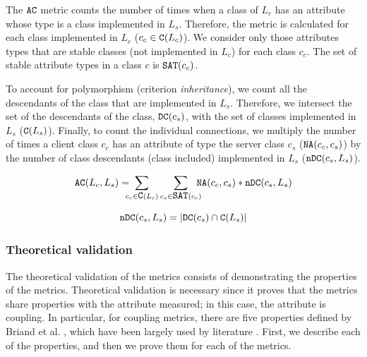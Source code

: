 The $\verb|AC|$ metric counts the number of times when a class of $L_c$ has an attribute whose type is a class implemented in $L_s$. Therefore, the metric is calculated for each class implemented in $L_c$ ($c_c \in \verb|C|(L_c)$). We consider only those attributes types that are stable classes (not implemented in $L_c$) for each class $c_c$. The set of stable attribute types in a class $c$ is $\verb|SAT|(c_c)$.

To account for polymorphism (criterion \textit{inheritance}), we count all the descendants of the class that are implemented in $L_s$. Therefore, we intersect the set of the descendants of the class, $\verb|DC|(c_s)$, with the set of
classes implemented in $L_s$ ($\verb|C|(L_s)$). Finally, to count the  individual connections, we multiply the number of times a client class $c_c$ has an attribute of type the server class $c_s$ ($\verb|NA|(c_c, c_s)$) by the number of class descendants (class included) implemented in $L_s$ ($\verb|nDC|(c_s,L_s)$).

\begin{equation}
\label{eqn:ac}
  \verb|AC|(L_c,L_s) = \!\!\!\!\sum_{c_c \in \verb|C|(L_c)} \sum_{c_s \in \verb|SAT|(c_c)} \!\!\!\!\verb|NA|(c_c, c_s)*\verb|nDC|(c_s, L_s)
\end{equation}

\begin{equation}
\label{eqn:ac-ndc}
    \verb|nDC|(c_s, L_s) = |\verb|DC|(c_s) \cap \verb|C|(L_s)|
\end{equation}

\subsubsection{Theoretical validation}
The theoretical validation of the metrics consists of demonstrating the properties of the metrics. Theoretical validation is necessary since it proves that the metrics share properties with the attribute measured; in this case, the attribute is coupling. In particular, for coupling metrics, there are five properties defined by Briand et al. \cite{briand1996property}, which have been largely used by literature \cite{poshyvanyk2006conceptual, allen1999measuring, zhao2004measuring}. First, we describe each of the properties, and then we prove them for each of the metrics.


